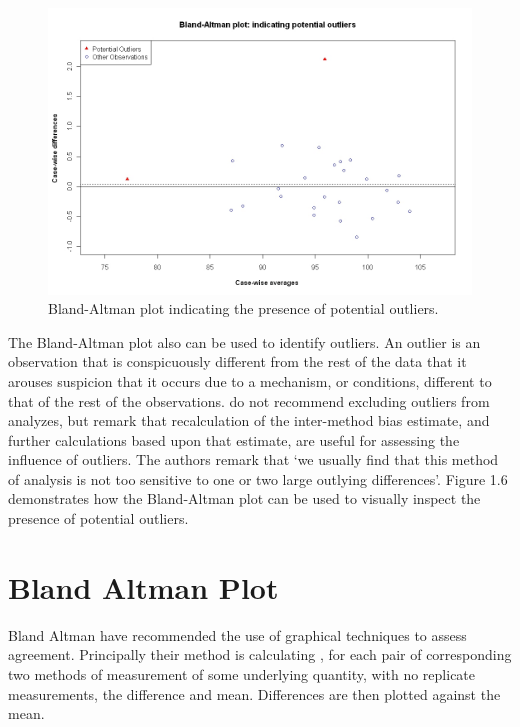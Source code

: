 \documentclass[Main.tex]{subfiles}
\begin{document}
\begin{figure}[h!]
	\begin{center}
		\includegraphics[width=125mm]{images/BAOutliers.jpeg}
		\caption{Bland-Altman plot indicating the presence of potential outliers.}\label{Outliers}
	\end{center}
\end{figure}



The Bland-Altman plot also can be used to identify outliers. An outlier is an observation that is conspicuously different from the
rest of the data that it arouses suspicion that it occurs due to a mechanism, or conditions, different to that of the rest of the
observations. \citet*{BA99} do not recommend excluding outliers from analyzes, but remark that recalculation of the inter-method bias estimate, and further calculations based upon that estimate, are useful for assessing the influence of outliers. The authors remark that `we usually find that this method of analysis is not too sensitive to one or two large outlying differences'. Figure 1.6 demonstrates how the Bland-Altman plot can be used to visually inspect the presence of potential outliers.

\section{Bland Altman Plot} Bland Altman have
recommended the use of graphical techniques to assess agreement.
Principally their method is calculating , for each pair of
corresponding two methods of measurement of some underlying
quantity, with no replicate measurements, the difference and mean.
Differences are then plotted against the mean.
\end{document}
